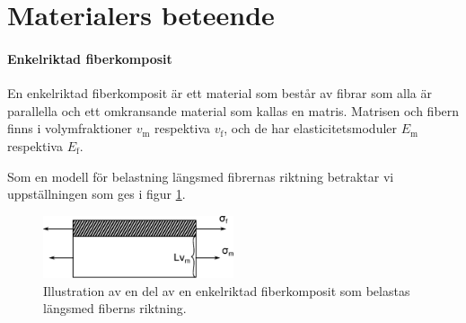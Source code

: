\section{Materialers beteende}

\paragraph{Enkelriktad fiberkomposit}
En enkelriktad fiberkomposit är ett material som består av fibrar som alla är parallella och ett omkransande material som kallas en matris. Matrisen och fibern finns i volymfraktioner $v_{\text{m}}$ respektiva $v_{\text{f}}$, och de har elasticitetsmoduler $E_{\text{m}}$ respektiva $E_{\text{f}}$.

Som en modell för belastning längsmed fibrernas riktning betraktar vi uppställningen som ges i figur \ref{fig:fiber_composite_parallel}.
\begin{figure}[!ht]
	\centering
	\includegraphics[width = 0.5\textwidth]{./Images/fiber_composite_parallel.eps}
	\caption{Illustration av en del av en enkelriktad fiberkomposit som belastas längsmed fiberns riktning.}
	\label{fig:fiber_composite_parallel}
\end{figure}

